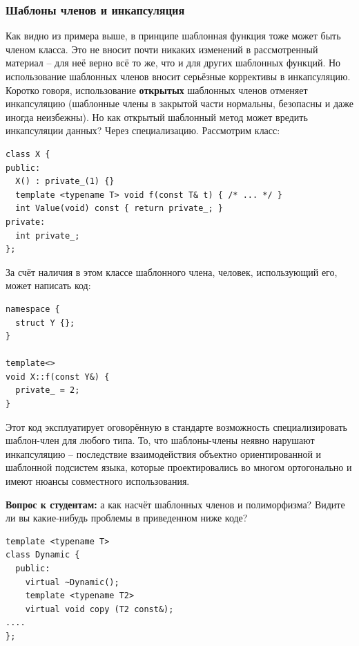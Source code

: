 \documentclass[a4paper,12pt,oneside]{article}
\newif\ifanswers
\begin{document}
\subsubsection{Шаблоны членов и инкапсуляция}\label{TemplMembersEncapsulation}

Как видно из примера выше, в принципе шаблонная функция тоже может быть членом класса. Это не вносит почти никаких изменений в рассмотренный материал -- для неё верно всё то же, что и для других шаблонных функций. Но использование шаблонных членов вносит серьёзные коррективы в инкапсуляцию. Коротко говоря, использование \textbf{открытых} шаблонных членов отменяет инкапсуляцию (шаблонные члены в закрытой части нормальны, безопасны и даже иногда неизбежны). Но как открытый шаблонный метод может вредить инкапсуляции данных? Через специализацию. Рассмотрим класс:

\begin{lstlisting}
class X {
public:
  X() : private_(1) {}
  template <typename T> void f(const T& t) { /* ... */ }
  int Value(void) const { return private_; }
private:
  int private_;  
};
\end{lstlisting}

За счёт наличия в этом классе шаблонного члена, человек, использующий его, может написать код:

\begin{lstlisting}
namespace {
  struct Y {};
}

template<>
void X::f(const Y&) {
  private_ = 2;
}
\end{lstlisting}

Этот код эксплуатирует оговорённую в стандарте возможность специализировать шаблон-член для любого типа. То, что шаблоны-члены неявно нарушают инкапсуляцию -- последствие взаимодействия объектно ориентированной и шаблонной подсистем языка, которые проектировались во многом ортогонально и имеют нюансы совместного использования.

\textbf{Вопрос к студентам:} а как насчёт шаблонных членов и полиморфизма? Видите ли вы какие-нибудь проблемы в приведенном ниже коде?

\begin{lstlisting}
template <typename T> 
class Dynamic { 
  public: 
    virtual ~Dynamic();
    template <typename T2> 
    virtual void copy (T2 const&); 
....
};
\end{lstlisting}

\ifanswers
Правильный ответ: да, проблемы есть. Обычный механизм виртуальных функций полагается на виртуальные таблицы фиксированного размера, однако количество актуальных экземпляров шаблонного метода может быть любым. Поэтому такие трюки в языке запрещены.
\fi
\end{document}
